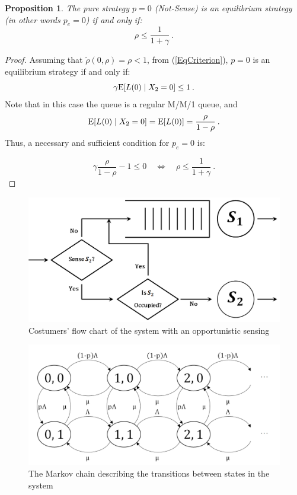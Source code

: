 \documentclass[11pt]{article}
\numberwithin{equation}{section}
\newtheorem{proposition}{Proposition}[section]
\newcommand{\e}{{\rm E}}
\begin{document}
\begin{proposition}
The pure strategy $p=0$ ({\it Not-Sense}) is an equilibrium strategy (in other words $p_e=0$) if and only if:
\[ \rho \leq \frac{1}{1+\gamma} \:.\]
\end{proposition}
\begin{proof}
Assuming that $\tilde{\rho}(0,\rho) = \rho < 1$, from (\ref{EqCriterion}), $p=0$ is an equilibrium strategy if and only if:
\[ \gamma \e[L(0)\mid X_2=0] \leq 1 \:.\]
Note that in this case the queue is a regular M/M/1 queue, and 
\[ \e[L(0)\mid X_2=0] = \e[L(0)] = \frac{\rho}{1-\rho} \:.\] 
Thus, a necessary and sufficient condition for $p_{e}=0$ is:

\[ \gamma \frac{\rho}{1-\rho}-1 \leq 0 \quad\Leftrightarrow\quad \rho \leq \frac{1}{1+\gamma} \:.\]
\end{proof}

\newpage
\begin{figure}[h!]
    \centering
    \includegraphics[width=1\textwidth]{Fig_1.png}
    \caption{Costumers' flow chart of the system with an opportunistic sensing}
    \label{CostumersFlow}
\end{figure}

\begin{figure}[h!]
  \centering
    \includegraphics[width=1\textwidth]{Fig_2.png}
    \caption{The Markov chain describing the transitions between states in the system}
    \label{MarkovChain}
\end{figure}
\end{document}
